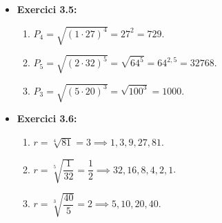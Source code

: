 \documentclass[12pt]{article}
\begin{document}
\begin{solucio}
\begin{itemize}
\begin{enumerate}[label=\alph*)]
        \item $a_1 = 1$, $r = -\dfrac{1}{3}$. $S_\infty = \dfrac{1}{1 + \frac{1}{3}} = \dfrac{3}{4}$.
        \item $r = 2 > 1$. La suma no convergeix.
    \end{enumerate}
    \item \textbf{Exercici 3.5:}
    \begin{enumerate}[label=\alph*)]
        \item $P_4 = \sqrt{(1 \cdot 27)^4} = 27^2 = 729$.
        \item $P_5 = \sqrt{(2 \cdot 32)^5} = \sqrt{64^5} = 64^{2{,}5} = 32768$.
        \item $P_3 = \sqrt{(5 \cdot 20)^3} = \sqrt{100^3} = 1000$.
    \end{enumerate}
    \item \textbf{Exercici 3.6:}
    \begin{enumerate}[label=\alph*)]
        \item $r = \sqrt[4]{81} = 3 \implies 1, 3, 9, 27, 81$.
        \item $r = \sqrt[5]{\dfrac{1}{32}} = \dfrac{1}{2} \implies 32, 16, 8, 4, 2, 1$.
        \item $r = \sqrt[3]{\dfrac{40}{5}} = 2 \implies 5, 10, 20, 40$.
    \end{enumerate}
\end{itemize}
\end{solucio}
\end{document}
